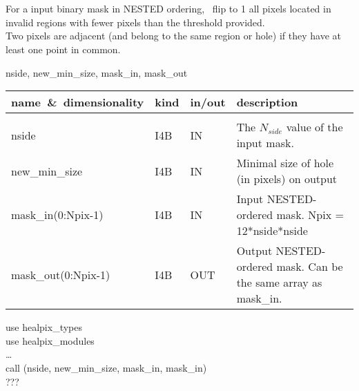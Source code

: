 \sloppy
{}\section[fill\_holes\_nest]{ }
\label{sub:fill_holes_nest}
\author{Eric Hivon}

\begin{facility}
{For a input binary mask in NESTED ordering, \thedocid\ flip to 1 all pixels located
in invalid regions with fewer pixels than the threshold provided.\\
Two pixels are adjacent (and belong to the same region or hole) if they have at
least one point in common.
}
{\modMaskTools}
\end{facility}

\begin{f90format}
{nside, new\_min\_size, mask\_in, mask\_out}
\end{f90format}

\begin{arguments}
{
\begin{tabular}{p{0.35\hsize} p{0.05\hsize} p{0.1\hsize} p{0.40\hsize}} \hline  
\textbf{name~\&~dimensionality} & \textbf{kind} & \textbf{in/out} & \textbf{description} \\ \hline
                   &   &   &                           \\ %
nside & I4B & IN & The $N_{side}$ value of the input mask. \\
new\_min\_size & I4B & IN & Minimal size of hole (in pixels) on output\\
mask\_in(0:Npix-1) & I4B & IN & Input NESTED-ordered mask. Npix = 12*nside*nside\\
mask\_out(0:Npix-1) &I4B & OUT & Output NESTED-ordered mask. Can be the same
array as mask\_in.
\end{tabular}
}
\end{arguments}

\begin{example}
{
use healpix\_types \\
use healpix\_modules \\
\ldots \\
call \thedocid(nside, new\_min\_size, mask\_in, mask\_in)  \\
}
{???
}
\end{example}

